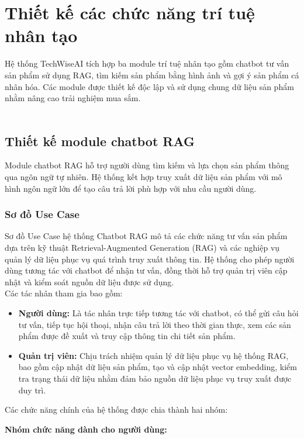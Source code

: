 \documentclass{report}
\begin{document}
\section{Thiết kế các chức năng trí tuệ nhân tạo}
Hệ thống TechWiseAI tích hợp ba module trí tuệ nhân tạo
gồm chatbot tư vấn sản phẩm sử dụng RAG, tìm kiếm sản phẩm
bằng hình ảnh và gợi ý sản phẩm cá nhân hóa.
Các module được thiết kế độc lập và sử dụng chung dữ liệu
sản phẩm nhằm nâng cao trải nghiệm mua sắm.\\\\

\subsection{Thiết kế module chatbot RAG}
Module chatbot RAG hỗ trợ người dùng tìm kiếm và lựa chọn
sản phẩm thông qua ngôn ngữ tự nhiên. Hệ thống kết hợp
truy xuất dữ liệu sản phẩm với mô hình ngôn ngữ lớn
để tạo câu trả lời phù hợp với nhu cầu người dùng.

\subsubsection{Sơ đồ Use Case}
Sơ đồ Use Case hệ thống Chatbot RAG mô tả các chức năng tư vấn sản phẩm dựa trên kỹ thuật Retrieval-Augmented Generation (RAG) và các nghiệp vụ quản lý dữ liệu phục vụ quá trình truy xuất thông tin. Hệ thống cho phép người dùng tương tác với chatbot để nhận tư vấn, đồng thời hỗ trợ quản trị viên cập nhật và kiểm soát nguồn dữ liệu được sử dụng.\\

Các tác nhân tham gia bao gồm:

\begin{itemize}
    \item \textbf{Người dùng:} Là tác nhân trực tiếp tương tác với chatbot, có thể gửi câu hỏi tư vấn, tiếp tục hội thoại, nhận câu trả lời theo thời gian thực, xem các sản phẩm được đề xuất và truy cập thông tin chi tiết sản phẩm.
    \item \textbf{Quản trị viên:} Chịu trách nhiệm quản lý dữ liệu phục vụ hệ thống RAG, bao gồm cập nhật dữ liệu sản phẩm, tạo và cập nhật vector embedding, kiểm tra trạng thái dữ liệu nhằm đảm bảo nguồn dữ liệu phục vụ truy xuất được duy trì.
\end{itemize}

Các chức năng chính của hệ thống được chia thành hai nhóm:

\textbf{Nhóm chức năng dành cho người dùng:}
\end{document}

